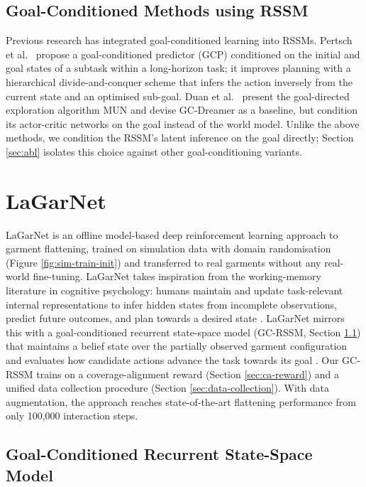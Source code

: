 \documentclass[journal]{IEEEtran}
\newif\ifshowrev\showrevtrue
\newcommand{\rev}[1]{\ifshowrev\textcolor{revblue}{#1}\else#1\fi}
\newif\ifshowirev\showirevtrue
\newcommand{\irev}[1]{\ifshowirev\textcolor{irevgreen}{#1}\else#1\fi}
\newif\ifshowrrev\showrrevtrue
\newcommand{\rrev}[1]{\ifshowrrev\textcolor{rrevred}{#1}\else#1\fi}
\begin{document}
\subsection{Goal-Conditioned Methods using RSSM}
\rev{Previous research has integrated goal-conditioned learning into RSSMs. Pertsch et al.~\cite{pertsch2020long} propose a goal-conditioned predictor (GCP) conditioned on the initial and goal states of a subtask within a long-horizon task; it improves planning with a hierarchical divide-and-conquer scheme that infers the action inversely from the current state and an optimised sub-goal. Duan et al.~\cite{duan2024learning} present the goal-directed exploration algorithm MUN and devise GC-Dreamer as a baseline, but \rrev{condition its actor-critic networks on the goal} instead of the world model. Unlike the above methods, we condition the RSSM's latent inference on the goal directly; Section \ref{sec:abl} isolates this choice against other goal-conditioning variants.}

\section{LaGarNet} \label{sec:planet-clothpick++}


\rev{LaGarNet is an offline model-based deep reinforcement learning approach to garment flattening, trained on simulation data with domain randomisation (Figure \ref{fig:sim-train-init}) and transferred \irev{to real garments without any real-world fine-tuning}. LaGarNet takes inspiration from the working-memory literature in cognitive psychology: humans maintain and update task-relevant internal representations to infer hidden states from incomplete observations, predict future outcomes, and plan towards a desired state \cite{miller2001integrative}. LaGarNet mirrors this with a goal-conditioned recurrent state-space model (GC-RSSM, Section \ref{sec:gc-rssm}) that maintains a belief state over the partially observed garment configuration and evaluates how candidate actions advance the task towards its goal \cite{hafner2019learning}. Our GC-RSSM trains on a coverage-alignment reward (Section \ref{sec:ca-reward}) and a unified data collection procedure (Section \ref{sec:data-collection}). With data augmentation, the approach reaches state-of-the-art flattening performance from only 100,000 interaction steps.}

\subsection{Goal-Conditioned Recurrent State-Space Model} \label{sec:gc-rssm}
\end{document}
